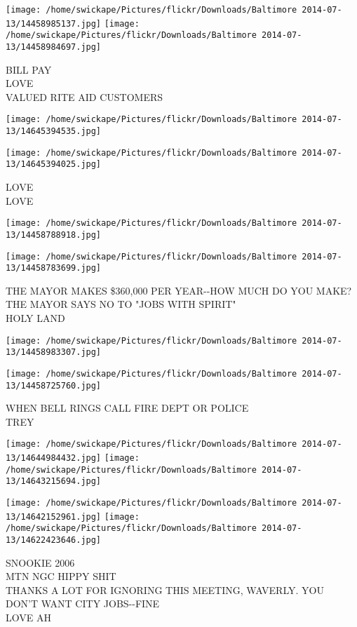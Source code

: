 \documentclass[10pt,letterpaper]{article}
\begin{document}
\vspace{0.25in}
\texttt{[image: /home/swickape/Pictures/flickr/Downloads/Baltimore 2014-07-13/14458985137.jpg]}
\texttt{[image: /home/swickape/Pictures/flickr/Downloads/Baltimore 2014-07-13/14458984697.jpg]}

BILL PAY\\
LOVE\\
VALUED RITE AID CUSTOMERS
\pagebreak

\texttt{[image: /home/swickape/Pictures/flickr/Downloads/Baltimore 2014-07-13/14645394535.jpg]}

\vspace{0.25in}
\texttt{[image: /home/swickape/Pictures/flickr/Downloads/Baltimore 2014-07-13/14645394025.jpg]}

LOVE\\
LOVE
\pagebreak

\texttt{[image: /home/swickape/Pictures/flickr/Downloads/Baltimore 2014-07-13/14458788918.jpg]}

\vspace{0.25in}
\texttt{[image: /home/swickape/Pictures/flickr/Downloads/Baltimore 2014-07-13/14458783699.jpg]}

THE MAYOR MAKES \$360,000 PER YEAR{-}{-}HOW MUCH DO YOU MAKE?  THE MAYOR SAYS NO TO "JOBS WITH SPIRIT"\\
HOLY LAND
\pagebreak

\texttt{[image: /home/swickape/Pictures/flickr/Downloads/Baltimore 2014-07-13/14458983307.jpg]}

\vspace{0.25in}
\texttt{[image: /home/swickape/Pictures/flickr/Downloads/Baltimore 2014-07-13/14458725760.jpg]}

WHEN BELL RINGS CALL FIRE DEPT OR POLICE\\
TREY
\pagebreak

\texttt{[image: /home/swickape/Pictures/flickr/Downloads/Baltimore 2014-07-13/14644984432.jpg]}
\texttt{[image: /home/swickape/Pictures/flickr/Downloads/Baltimore 2014-07-13/14643215694.jpg]}

\texttt{[image: /home/swickape/Pictures/flickr/Downloads/Baltimore 2014-07-13/14642152961.jpg]}
\texttt{[image: /home/swickape/Pictures/flickr/Downloads/Baltimore 2014-07-13/14622423646.jpg]}

SNOOKIE 2006\\
MTN NGC HIPPY SHIT\\
THANKS A LOT FOR IGNORING THIS MEETING, WAVERLY.  YOU DON'T WANT CITY JOBS{-}{-}FINE\\
LOVE AH
\pagebreak
\end{document}
